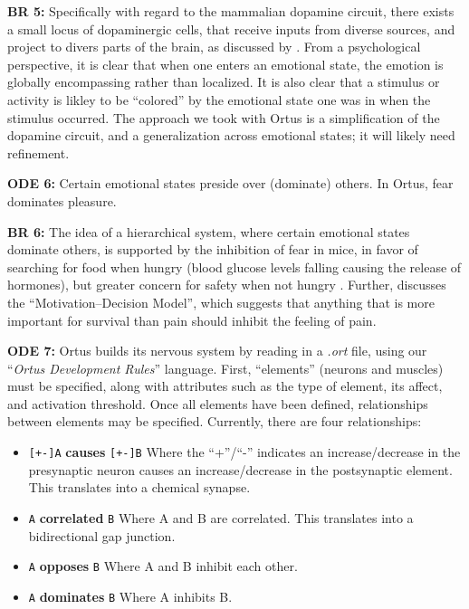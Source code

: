 \documentclass[letterpaper]{article}
\begin{document}
\textbf{BR 5:} Specifically with regard to the mammalian dopamine circuit, there exists a small locus of dopaminergic cells, that receive inputs from diverse sources, and project to divers parts of the brain, as discussed by \citet{Beier2015}. From a psychological perspective, it is clear that when one enters an emotional state, the emotion is globally encompassing rather than localized. It is also clear that a stimulus or activity is likley to be ``colored'' by the emotional state one was in when the stimulus occurred. The approach we took with Ortus is a simplification of the dopamine circuit, and a generalization across emotional states; it will likely need refinement.

\textbf{ODE 6:} Certain emotional states preside over (dominate) others. In Ortus, fear dominates pleasure.

\textbf{BR 6:} The idea of a hierarchical system, where certain emotional states dominate others, is supported by the inhibition of fear in mice, in favor of searching for food when hungry (blood glucose levels falling causing the release of hormones), but greater concern for safety when not hungry \citep{Verma2015}. Further, \citet{Leknes2008} discusses the ``Motivation--Decision Model'', which suggests that anything that is more important for survival than pain should inhibit the feeling of pain.


\textbf{ODE 7:} Ortus builds its nervous system by reading in a \textit{.ort} file, using our ``\textit{Ortus Development Rules}'' language. First, ``elements'' (neurons and muscles) must be specified, along with attributes such as the type of element, its affect, and activation threshold. Once all elements have been defined, relationships between elements may be specified. Currently, there are four relationships:
\begin{itemize}
    \itemsep0em
    \item \texttt{[+-]A} \textbf{causes} \texttt{[+-]B}
        \subitem Where the ``+''/``-'' indicates an increase/decrease in the presynaptic neuron causes an increase/decrease in the postsynaptic element. This translates into a chemical synapse.
    \item \texttt{A} \textbf{correlated} \texttt{B}
        \subitem Where A and B are correlated. This translates into a bidirectional gap junction.
    \item \texttt{A} \textbf{opposes} \texttt{B}
        \subitem Where A and B inhibit each other.
     \item \texttt{A} \textbf{dominates} \texttt{B}
         \subitem Where A inhibits B.
\end{itemize}
\end{document}
